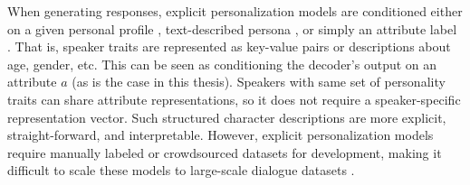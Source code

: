 When generating responses, explicit personalization models are conditioned either on a given personal profile \citep{ijcai2018-595}, text-described persona \citep{zhang-etal-2018-personalizing}, or simply an attribute label \citep{madotto-etal-2020-plug}. That is, speaker traits are represented as key-value pairs or descriptions about age, gender, etc. This can be seen as conditioning the decoder's output on an attribute $a$ (as is the case in this thesis). Speakers with same set of personality traits can share attribute representations, so it does not require a speaker-specific representation vector. Such structured character descriptions are more explicit, straight-forward, and interpretable. However, explicit personalization models require manually labeled or crowdsourced datasets for development, making it difficult to scale these models to large-scale dialogue datasets \citep{zheng2019personalized, madotto-etal-2020-plug}.



